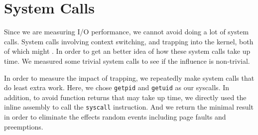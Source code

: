 \section{System Calls}

Since we are measuring I/O performance, we cannot avoid doing a lot of system calls. System calls involving context switching, and trapping into the kernel, both of which might . In order to get an better idea of how these system calls take up time. We measured some trivial system calls to see if the influence is non-trivial.

In order to measure the impact of trapping, we repeatedly make system calls that do least extra work. Here, we chose \texttt{getpid} and \texttt{getuid} as our syscalls. In addition, to avoid function returns that may take up time, we directly used the inline assembly to call the \texttt{syscall} instruction. And we return the minimal result in order to eliminate the effects random events including page faults and preemptions.